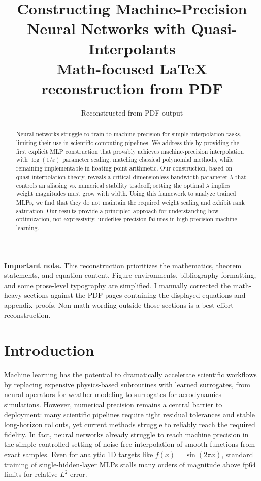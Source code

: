 \documentclass[11pt]{article}
\title{Constructing Machine-Precision Neural Networks with Quasi-Interpolants\\
\large Math-focused LaTeX reconstruction from PDF}
\author{Reconstructed from PDF output}
\date{}
\newcommand{\eps}{\varepsilon}
\begin{document}
\maketitle

\noindent\textbf{Important note.} This reconstruction prioritizes the mathematics, theorem statements, and equation content. Figure environments, bibliography formatting, and some prose-level typography are simplified. I manually corrected the math-heavy sections against the PDF pages containing the displayed equations and appendix proofs. Non-math wording outside those sections is a best-effort reconstruction.

\begin{abstract}
Neural networks struggle to train to machine precision for simple interpolation tasks, limiting their use in scientific computing pipelines. We address this by providing the first explicit MLP construction that provably achieves machine-precision interpolation with $\log(1/\eps)$ parameter scaling, matching classical polynomial methods, while remaining implementable in floating-point arithmetic. Our construction, based on quasi-interpolation theory, reveals a critical dimensionless bandwidth parameter $\lambda$ that controls an aliasing vs. numerical stability tradeoff; setting the optimal $\lambda$ implies weight magnitudes must grow with width. Using this framework to analyze trained MLPs, we find that they do not maintain the required weight scaling and exhibit rank saturation. Our results provide a principled approach for understanding how optimization, not expressivity, underlies precision failures in high-precision machine learning.
\end{abstract}

\section{Introduction}
Machine learning has the potential to dramatically accelerate scientific workflows by replacing expensive physics-based subroutines with learned surrogates, from neural operators for weather modeling to surrogates for aerodynamics simulations. However, numerical precision remains a central barrier to deployment: many scientific pipelines require tight residual tolerances and stable long-horizon rollouts, yet current methods struggle to reliably reach the required fidelity. In fact, neural networks already struggle to reach machine precision in the simple controlled setting of noise-free interpolation of smooth functions from exact samples. Even for analytic 1D targets like $f(x)=\sin(2\pi x)$, standard training of single-hidden-layer MLPs stalls many orders of magnitude above fp64 limits for relative $L^2$ error.
\end{document}
